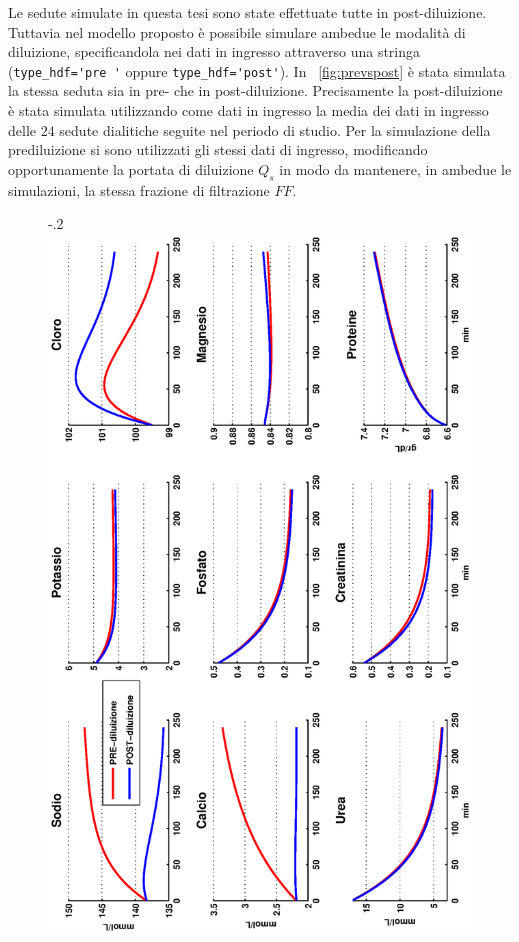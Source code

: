 Le sedute simulate in questa tesi sono state effettuate tutte in post-diluizione. Tuttavia nel modello proposto è possibile simulare ambedue le modalità di diluizione, specificandola nei dati in ingresso attraverso una stringa (\verb|type_hdf='pre '| oppure \verb|type_hdf='post'|). In \figurename~\ref{fig:prevspost} è stata simulata la stessa seduta sia in pre- che in post-diluizione. Precisamente la post-diluizione è stata simulata utilizzando come dati in ingresso la media dei dati in ingresso delle $24$ sedute dialitiche seguite nel periodo di studio. Per la simulazione della prediluizione si sono utilizzati gli stessi dati di ingresso, modificando opportunamente la portata di diluizione $Q_s$ in modo da mantenere, in ambedue le simulazioni, la stessa frazione di filtrazione $FF$.
\begin{figure}[tbh]
	\centering
	\advance\leftskip-.2\textwidth
		\includegraphics[angle=-90, width=1.4\textwidth]{immagini/prevspost.eps}

\end{figure}
